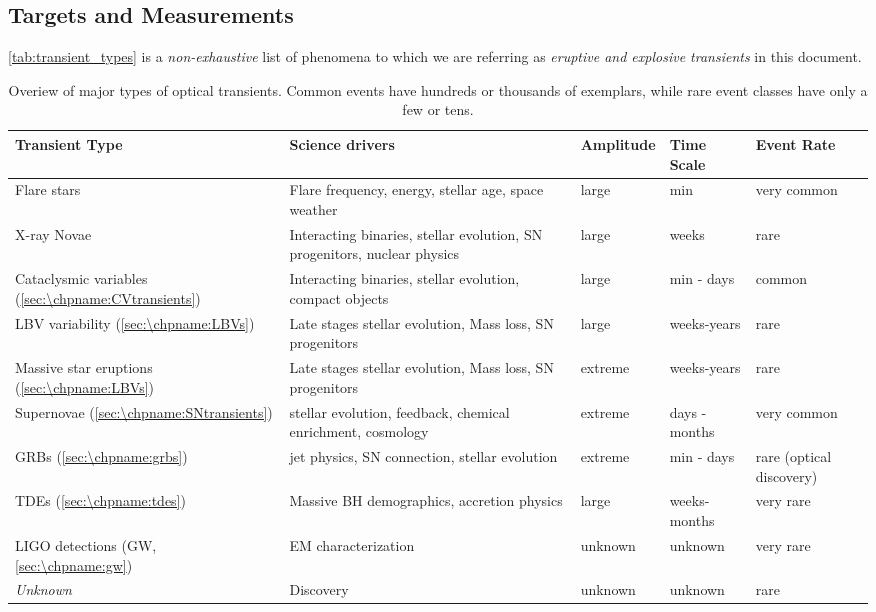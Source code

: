 \subsection{Targets and Measurements}
\label{sec:\chpname:targets}

\autoref{tab:transient_types} is a \emph{non-exhaustive} list of
phenomena to which we are referring as \emph{eruptive and explosive
  transients} in this document.

  \begin{table}
\begin{center}
  \begin{tabular}{| p{4.0cm} | p{4.0cm} | l | l | p{1.5cm}|}
    \hline

    Transient Type & Science drivers & Amplitude & Time Scale & Event Rate\\
\hline

Flare stars & Flare frequency, energy, stellar age, space weather & large &
	  min & very common\\

X-ray Novae & Interacting binaries, stellar evolution, SN progenitors,
nuclear physics & large & weeks & rare\\

Cataclysmic variables (\ref{sec:\chpname:CVtransients})& Interacting binaries, stellar evolution, compact
objects & large & min - days & common\\

LBV variability (\ref{sec:\chpname:LBVs})& Late stages stellar evolution, Mass loss, SN progenitors
& large & weeks-years & rare \\

Massive star eruptions (\ref{sec:\chpname:LBVs})& Late stages stellar evolution, Mass loss, SN progenitors & extreme & weeks-years & rare\\

Supernovae (\ref{sec:\chpname:SNtransients})& stellar evolution, feedback, chemical enrichment, cosmology & extreme & days - months & very common\\

GRBs (\ref{sec:\chpname:grbs})& jet physics, SN connection, stellar evolution & extreme & min - days
	  & rare (optical discovery) \\

TDEs (\ref{sec:\chpname:tdes})& Massive BH demographics, accretion physics & large & weeks-months & very rare\\


LIGO detections (GW, \ref{sec:\chpname:gw}) & EM characterization & unknown
	  & unknown & very rare\\

\emph{Unknown} & Discovery & unknown & unknown & rare\\

 \hline \end{tabular}
\end{center}
\caption{Overiew of major types of optical transients.  Common events have
hundreds or thousands of exemplars, while rare event classes have only a
	  few or tens.
\label{tab:transient_types}}
\end{table}

